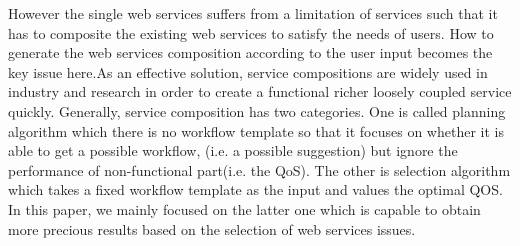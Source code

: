 \documentclass[senior,final,11pt]{iscs-thesis}
\begin{document}
However the single web services suffers from a limitation of services such that it has to composite the existing web services to satisfy the needs of users. How to generate the web services composition according to the user input becomes the key issue here.As an effective solution, service compositions are widely used in industry and research in order to create a functional richer loosely coupled service quickly. 
Generally, service composition has two categories. One is called planning algorithm which there is no workflow template so that it focuses on whether it is able to get a possible workflow, (i.e.  a possible suggestion) but ignore the performance of non-functional part(i.e. the QoS).
The other is selection algorithm which takes a fixed workflow template as the input and values the optimal QOS.
In this paper, we mainly focused on the latter one which is capable to obtain more precious results based on the selection of web services issues.
\end{document}
